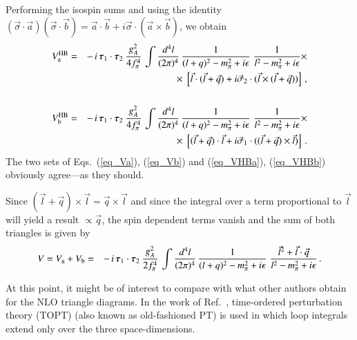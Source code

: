 \documentclass[sort&compress,preprint,3p]{elsarticle}
\newcommand{\bbox}[1]{\mbox{\boldmath $#1$}}
\begin{document}
Performing the isospin sums and using the
identity
$(\vec \sigma \cdot \vec a)(\vec \sigma \cdot \vec b) =
\vec a \cdot \vec b + i \vec \sigma \cdot (\vec a \times \vec b)$,
we obtain
\begin{eqnarray}
V_{\rm a}^{\rm HB} &=& 
 -\, i\, \bbox{\tau}_1 \cdot \bbox{\tau}_2 \:
\frac{g_A^2}{4 f_\pi^4} \,
\int \frac{d^4 l}{(2\pi)^4} \,
\frac{1}{(l+q)^2-m_\pi^2+i\epsilon} \;
\frac{1}{l^2-m_\pi^2+i\epsilon}
\times \nonumber \\ && \times \;
\left[ \vec l \cdot (\vec l + \vec q) +
i\vec \sigma_2 \cdot (\vec l \times (\vec l + \vec q)) \right]
\label{eq_VHBa} \,, \\
\nonumber \\
V_{\rm b}^{\rm HB} &=& 
 -\, i\, \bbox{\tau}_1 \cdot \bbox{\tau}_2 \:
\frac{g_A^2}{4 f_\pi^4} \,
\int \frac{d^4 l}{(2\pi)^4} \,
\frac{1}{(l+q)^2-m_\pi^2+i\epsilon} \;
\frac{1}{l^2-m_\pi^2+i\epsilon}
\times \nonumber \\ && \times \;
\left[ (\vec l + \vec q) \cdot \vec l +
i\vec \sigma_1 \cdot ((\vec l + \vec q) \times \vec l) \right]
\,.
\label{eq_VHBb}
\end{eqnarray}
%
The two sets of Eqs.\ (\ref{eq_Va}), (\ref{eq_Vb})
and (\ref{eq_VHBa}), (\ref{eq_VHBb})
obviously agree---as they should.

Since $(\vec l +\vec q)\times \vec l = \vec q \times \vec l$
and since the integral over a term proportional to $\vec l$ will yield a result
$\propto \vec q$,  the spin dependent terms vanish and the sum
of both triangles is given by
%
\begin{eqnarray}
V = V_{\rm a} + V_{\rm b}
&=& 
 -\, i\, \bbox{\tau}_1 \cdot \bbox{\tau}_2 \:
\frac{g_A^2}{2 f_\pi^4} \,
\int \frac{d^4 l}{(2\pi)^4} \,
\frac{1}{(l+q)^2-m_\pi^2+i\epsilon} \;
\frac{\vec l^2 + \vec l \cdot \vec q}{l^2-m_\pi^2+i\epsilon} 
\,.
\label{eq_tri4}
\end{eqnarray}
%

At this point, it might be of interest to compare
with what other authors obtain for the NLO triangle diagrams.
In the work of Ref.~\cite{ORK96}, time-ordered perturbation
theory (TOPT) (also known as old-fashioned PT)
is used in which loop integrals extend
only over the three space-dimensions.
\end{document}
